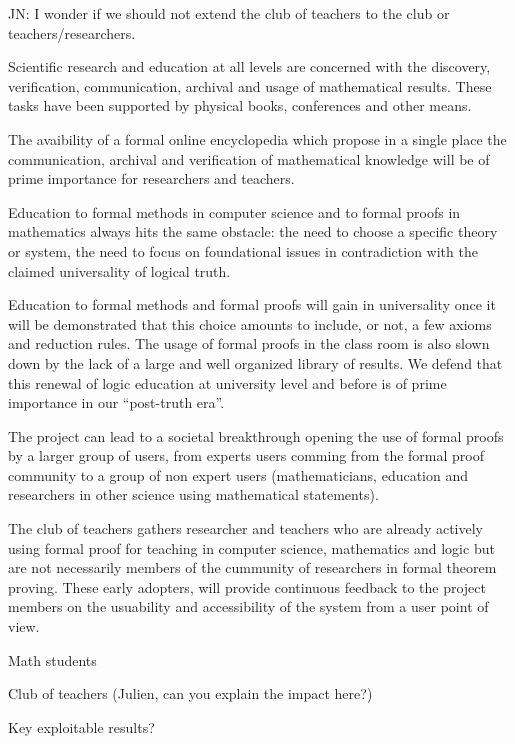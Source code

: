 {\color{red} JN: I wonder if we should not extend the club of teachers to the club or teachers/researchers.}

Scientific research and education at all levels are concerned with the discovery, verification, communication, archival and usage of mathematical results.
These tasks have been supported by physical books, conferences and other means.

The avaibility of a formal online encyclopedia which propose in a single place the communication, archival and verification of mathematical  knowledge will be of prime importance for researchers and teachers.

Education to formal methods in computer science and to formal proofs
in mathematics always hits the same obstacle: the need to choose a
specific theory or system, the need to focus on foundational issues in contradiction with the claimed universality of logical truth. 

Education to formal methods and formal proofs will gain in universality once it will be demonstrated that this choice amounts to include, or not, a few axioms and reduction
rules. 
The usage of formal proofs in the class room is also slown down by the lack of a large and well organized library of results.
We defend that this renewal of logic education at university level and before is of prime importance in our ``post-truth era''.

The project can lead to a societal breakthrough opening the use of formal proofs by a larger group of users, from experts users comming from the formal proof community  to a group of non expert users (mathematicians, education and researchers in other science using mathematical statements). 

The club of teachers gathers researcher and teachers who are already actively using formal proof for teaching in computer science, mathematics and logic but are not necessarily members of the cummunity of researchers in formal theorem proving. These early adopters, will provide continuous feedback to the project members on the usuability and accessibility of the system from a user point of view.

Math students 

{\color{red} Club of teachers (Julien, can you explain the impact here?)}

{\color{red} Key exploitable results?}

